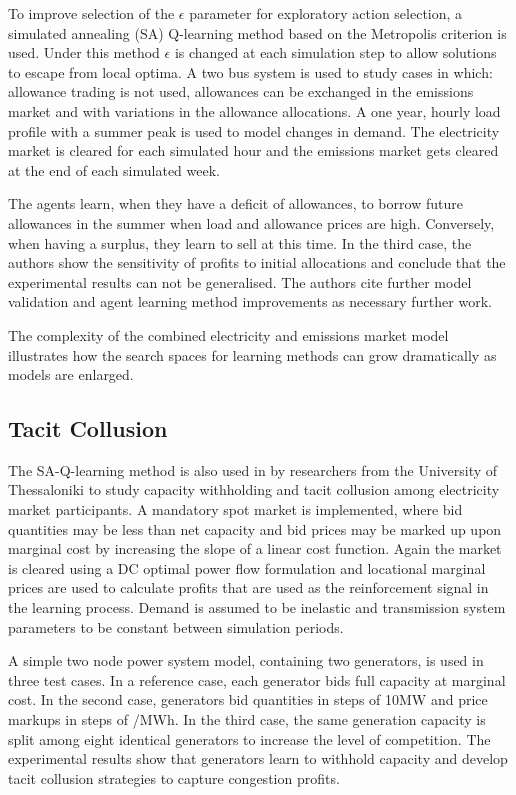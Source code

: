 To improve selection of the $\epsilon$ parameter for exploratory action
selection, a simulated annealing (SA) Q-learning method based on the Metropolis
criterion \cite{guo:sa} is used.  Under this method $\epsilon$ is changed at
each simulation step to allow solutions to escape from local optima.  A two bus
system is used to study cases in which: allowance trading is not used,
allowances can be exchanged in the emissions market and with variations in the
allowance allocations.  A one year, hourly load profile with a summer peak is
used to model changes in demand.  The electricity market is cleared for each
simulated hour and the emissions market gets cleared at the end of each
simulated week.

The agents learn, when they have a deficit of allowances, to borrow future
allowances in the summer when load and allowance prices are high.  Conversely,
when having a surplus, they learn to sell at this time.  In the third case, the
authors show the sensitivity of profits to initial allocations and conclude that
the experimental results can not be generalised.  The authors cite further model
validation and agent learning method improvements as necessary further work.

The complexity of the combined electricity and emissions market model
illustrates how the search spaces for learning methods can grow dramatically as
models are enlarged.

\subsection{Tacit Collusion}
The SA-Q-learning method is also used in  by researchers
from the University of Thessaloniki to study capacity withholding and tacit
collusion among electricity market participants.  A mandatory spot market is
implemented, where bid quantities may be less than net capacity and bid prices
may be marked up upon marginal cost by increasing the slope of a linear cost
function.  Again the market is cleared using a DC optimal power flow formulation
and locational marginal prices are used to calculate profits that are used as
the reinforcement signal in the learning process.  Demand is assumed to be
inelastic and transmission system parameters to be constant between simulation
periods.

A simple two node power system model, containing two generators, is used in
three test cases. In a reference case, each generator bids full capacity at
marginal cost.  In the second case, generators bid quantities in steps of 10MW
and price markups in steps of /MWh.  In the third case, the same
generation capacity is split among eight identical generators to increase the
level of competition. The experimental results show that generators learn to
withhold capacity and develop tacit collusion strategies to capture congestion
profits.

